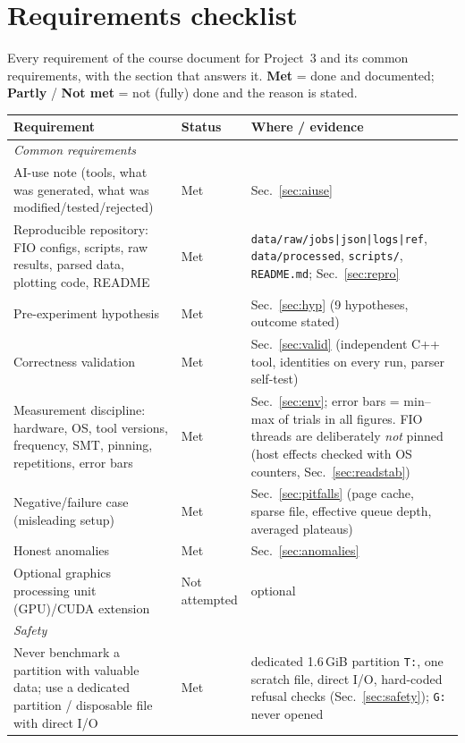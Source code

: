 \documentclass{article}
\begin{document}
\section{Requirements checklist}\label{sec:checklist}
Every requirement of the course document \cite{course} for Project~3 and its common requirements, with the section that answers it. \textbf{Met} = done and documented; \textbf{Partly} / \textbf{Not met} = not (fully) done and the reason is stated.
\begin{center}\footnotesize
\begin{longtable}{p{6.1cm}p{1.5cm}p{8.0cm}}
\toprule
\textbf{Requirement} & \textbf{Status} & \textbf{Where / evidence} \\
\midrule
\endhead
\multicolumn{3}{l}{\textit{Common requirements}} \\
AI-use note (tools, what was generated, what was modified/tested/rejected) & Met & Sec.~\ref{sec:aiuse} \\
Reproducible repository: FIO configs, scripts, raw results, parsed data, plotting code, README & Met & \texttt{data/raw/jobs|json|logs|ref}, \texttt{data/processed}, \texttt{scripts/}, \texttt{README.md}; Sec.~\ref{sec:repro} \\
Pre-experiment hypothesis & Met & Sec.~\ref{sec:hyp} (9 hypotheses, outcome stated) \\
Correctness validation & Met & Sec.~\ref{sec:valid} (independent C++ tool, identities on every run, parser self-test) \\
Measurement discipline: hardware, OS, tool versions, frequency, SMT, pinning, repetitions, error bars & Met & Sec.~\ref{sec:env}; error bars = min--max of trials in all figures. FIO threads are deliberately \emph{not} pinned (host effects checked with OS counters, Sec.~\ref{sec:readstab}) \\
Negative/failure case (misleading setup) & Met & Sec.~\ref{sec:pitfalls} (page cache, sparse file, effective queue depth, averaged plateaus) \\
Honest anomalies & Met & Sec.~\ref{sec:anomalies} \\
Optional graphics processing unit (GPU)/CUDA extension & Not attempted & optional \\
\midrule
\multicolumn{3}{l}{\textit{Safety}} \\
Never benchmark a partition with valuable data; use a dedicated partition / disposable file with direct I/O & Met & dedicated 1.6\,GiB partition \texttt{T:}, one scratch file, direct I/O, hard-coded refusal checks (Sec.~\ref{sec:safety}); \texttt{G:} never opened \\

\end{longtable}
\end{center}
\end{document}
